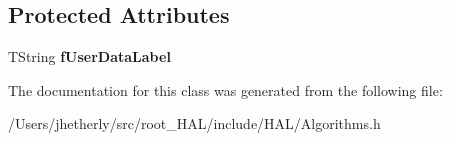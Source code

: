 \subsection*{Protected Attributes}
\begin{DoxyCompactItemize}
\item 
\hypertarget{class_h_a_l_1_1internal_1_1_import_value_algo_ad420bd4c07c0532af15b44a1ad62b8c7}{T\-String {\bfseries f\-User\-Data\-Label}}\label{class_h_a_l_1_1internal_1_1_import_value_algo_ad420bd4c07c0532af15b44a1ad62b8c7}

\end{DoxyCompactItemize}


The documentation for this class was generated from the following file\-:\begin{DoxyCompactItemize}
\item 
/\-Users/jhetherly/src/root\-\_\-\-H\-A\-L/include/\-H\-A\-L/Algorithms.\-h\end{DoxyCompactItemize}
